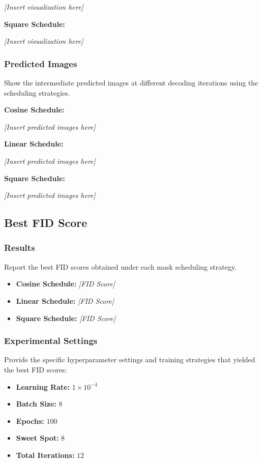\textit{[Insert visualization here]}

\textbf{Square Schedule:}

\textit{[Insert visualization here]}

\subsubsection{Predicted Images}
Show the intermediate predicted images at different decoding iterations using the scheduling strategies.

\textbf{Cosine Schedule:}

\textit{[Insert predicted images here]}

\textbf{Linear Schedule:}

\textit{[Insert predicted images here]}

\textbf{Square Schedule:}

\textit{[Insert predicted images here]}

\subsection{Best FID Score}

\subsubsection{Results}
Report the best FID scores obtained under each mask scheduling strategy.

\begin{itemize}
    \item \textbf{Cosine Schedule:} \textit{[FID Score]}
    \item \textbf{Linear Schedule:} \textit{[FID Score]}
    \item \textbf{Square Schedule:} \textit{[FID Score]}
\end{itemize}

\subsubsection{Experimental Settings}
Provide the specific hyperparameter settings and training strategies that yielded the best FID scores:

\begin{itemize}
    \item \textbf{Learning Rate:} $1\times10^{-4}$
    \item \textbf{Batch Size:} $8$
    \item \textbf{Epochs:} $100$
    \item \textbf{Sweet Spot:} $8$
    \item \textbf{Total Iterations:} $12$
\end{itemize}
